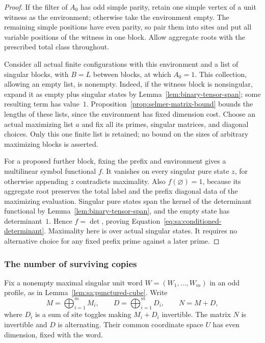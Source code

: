 \begin{proof}
If the filter of $A_0$ has odd simple parity, retain one simple
vertex of a unit witness as the environment; otherwise take the
environment empty.  The remaining simple positions have even parity,
so pair them into sites and put all variable positions of the witness
in one block.  Allow aggregate roots with the prescribed total class
throughout.

Consider all actual finite configurations with this environment and
a list of singular blocks, with $B=L$ between blocks, at which
$A_0=1$.  This collection, allowing an empty list, is nonempty.
Indeed, if the witness block is nonsingular, expand it as empty plus
singular states by Lemma~\ref{lem:binary-tensor-span}; some resulting
term has value~$1$.  Proposition~\ref{prop:selmer-matrix-bound}
bounds the lengths of these lists, since the environment has fixed
dimension cost.  Choose an actual maximizing list $a$ and fix all
its primes, singular matrices, and diagonal choices.  Only this one
finite list is retained; no bound on the sizes of arbitrary maximizing
blocks is asserted.

For a proposed further block, fixing the prefix and environment gives
a multilinear symbol functional $f$.  It vanishes on every singular
pure state $z$, for otherwise appending $z$ contradicts maximality.
Also $f(\varnothing)=1$, because its aggregate root preserves the
total label and the prefix diagonal data of the maximizing evaluation.
Singular pure states span the kernel of the determinant functional
by Lemma~\ref{lem:binary-tensor-span}, and the empty state has
determinant~$1$.  Hence $f=\det$, proving
Equation~\eqref{eq:sa:conditioned-determinant}.  Maximality here is
over actual singular states.  It requires no alternative choice for
any fixed prefix prime against a later prime.
\end{proof}

\subsubsection{The number of surviving copies}

Fix a nonempty maximal singular unit word
$W=(W_1,\ldots,W_m)$ in an odd profile, as in
Lemma~\ref{lem:sa:punctured-cube}. Write
\[
 M=\bigoplus_{i=1}^mM_i,\qquad
 D=\bigoplus_{i=1}^mD_i,\qquad N=M+D,
\]
where $D_i$ is a sum of site toggles making $M_i+D_i$ invertible.
The matrix $N$ is invertible and $D$ is alternating. Their common
coordinate space $U$ has even dimension, fixed with the word.

